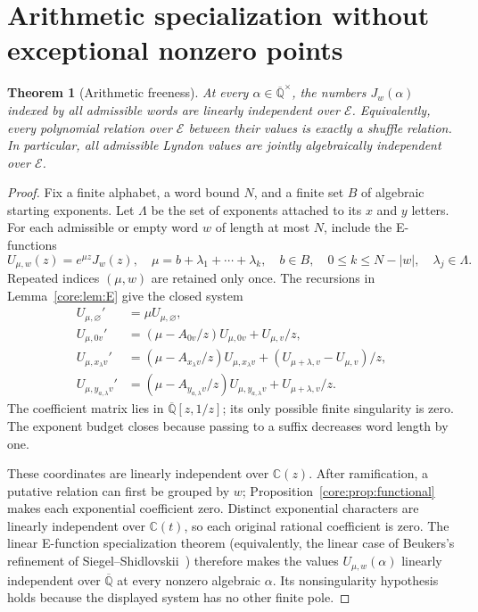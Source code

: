 \documentclass[11pt,a4paper]{article}
\newcommand{\Qbar}{\overline{\mathbb Q}}
\newcommand{\E}{\mathcal E}
\newtheorem{theorem}{Theorem}[section]
\theoremstyle{definition}
\theoremstyle{remark}
\numberwithin{equation}{section}
\begin{document}
\section{Arithmetic specialization without exceptional nonzero points}
\label{core:sec:values}
\begin{theorem}[Arithmetic freeness]\label{core:thm:arithmetic}
At every $\alpha\in\Qbar^\times$, the numbers $J_w(\alpha)$ indexed
by all admissible words are linearly independent over $\E$.
Equivalently, every polynomial relation over $\E$ between their values
is exactly a shuffle relation. In particular, all admissible Lyndon
values are jointly algebraically independent over $\E$.
\end{theorem}
\begin{proof}
Fix a finite alphabet, a word bound $N$, and a finite set $B$ of
algebraic starting exponents. Let $\Lambda$ be the set of exponents
attached to its $x$ and $y$ letters. For each admissible or empty word
$w$ of length at most $N$, include the E-functions
\[
 U_{\mu,w}(z)=e^{\mu z}J_w(z),\quad
 \mu=b+\lambda_1+\cdots+\lambda_k,
 \quad b\in B,\quad 0\le k\le N-|w|,\quad\lambda_j\in\Lambda.
\]
Repeated indices $(\mu,w)$ are retained only once. The recursions
in Lemma~\ref{core:lem:E} give the closed system
\begin{align*}
 U_{\mu,\varnothing}'&=\mu U_{\mu,\varnothing},\\
 U_{\mu,0v}'&=(\mu-A_{0v}/z)U_{\mu,0v}+U_{\mu,v}/z,\\
 U_{\mu,x_\lambda v}'&=(\mu-A_{x_\lambda v}/z)U_{\mu,x_\lambda v}
              +(U_{\mu+\lambda,v}-U_{\mu,v})/z,\\
 U_{\mu,y_{a,\lambda}v}'&=(\mu-A_{y_{a,\lambda}v}/z)U_{\mu,y_{a,\lambda}v}
              +U_{\mu+\lambda,v}/z.
\end{align*}
The coefficient matrix lies in $\Qbar[z,1/z]$; its only possible
finite singularity is zero. The exponent budget closes because
passing to a suffix decreases word length by one.

These coordinates are linearly independent over $\mathbb C(z)$.
After ramification, a putative relation can first be grouped by $w$;
Proposition~\ref{core:prop:functional} makes each exponential coefficient
zero. Distinct exponential characters are linearly independent over
$\mathbb C(t)$, so each original rational coefficient is zero.
The linear E-function specialization theorem (equivalently, the linear
case of Beukers's refinement of Siegel--Shidlovskii~\cite[Corollary 1.4]{Beukers}) therefore makes
the values $U_{\mu,w}(\alpha)$ linearly independent over $\Qbar$
at every nonzero algebraic $\alpha$. Its nonsingularity hypothesis
holds because the displayed system has no other finite pole.


\end{proof}
\end{document}
